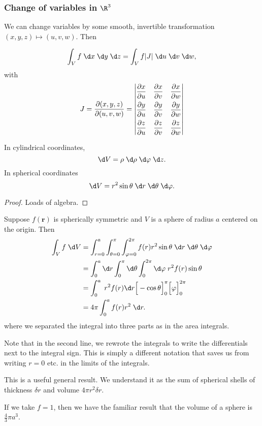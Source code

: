 \documentclass[a4paper]{article}
\begin{document}
\subsubsection{Change of variables in \texorpdfstring{$\R^3$}{R3}}
We can change variables by some smooth, invertible transformation $(x, y, z)\mapsto (u, v, w)$. Then
\begin{prop}
  \[
    \int_V f\;\d x\;\d y\;\d z = \int_V f|J|\;\d u\;\d v\;\d w,
  \]
  with
  \[
    J = \frac{\partial(x, y, z)}{\partial(u, v, w)} =
    \begin{vmatrix}
      \dfrac{\partial x}{\partial u} & \dfrac{\partial x}{\partial v} & \dfrac{\partial x}{\partial w}\vspace{5pt} \\ 
      \dfrac{\partial y}{\partial u} & \dfrac{\partial y}{\partial v} & \dfrac{\partial y}{\partial w}\vspace{5pt} \\ 
      \dfrac{\partial z}{\partial u} & \dfrac{\partial z}{\partial v} & \dfrac{\partial z}{\partial w}
    \end{vmatrix}
  \]
\end{prop}

\begin{prop}
  In cylindrical coordinates,
  \[
    \d V = \rho\;\d \rho\;\d \varphi\;\d z.
  \]
  In spherical coordinates 
  \[
    \d V = r^2\sin\theta \;\d r\;\d \theta\;\d \varphi.
  \]
\end{prop}

\begin{proof}
  Loads of algebra.
\end{proof}

\begin{eg}
  Suppose $f(\mathbf{r})$ is spherically symmetric and $V$ is a sphere of radius $a$ centered on the origin. Then
  \begin{align*}
    \int_V f\;\d V &= \int_{r = 0}^a \int_{\theta = 0}^\pi \int_{\varphi = 0}^{2\pi} f(r)r^2 \sin\theta\;\d r\;\d \theta\;\d\varphi\\
    &= \int_0^a \d r\int_0^\pi \d \theta\int_0^{2\pi} \d \varphi \;r^2 f(r) \sin \theta\\
    &= \int_0^a \; r^2 f(r) \d r\Big[-\cos \theta\Big]_0^\pi \Big[\varphi\Big]_0^{2\pi}\\
    &= 4\pi\int_0^a f(r)r^2 \;\d r.
  \end{align*}
  where we separated the integral into three parts as in the area integrals.

  Note that in the second line, we rewrote the integrals to write the differentials next to the integral sign. This is simply a different notation that saves us from writing $r = 0$ etc. in the limits of the integrals.

  This is a useful general result. We understand it as the sum of spherical shells of thickness $\delta r$ and volume $4\pi r^2 \delta r$.

  If we take $f = 1$, then we have the familiar result that the volume of a sphere is $\frac{4}{3}\pi a^3$.
\end{eg}
\end{document}
